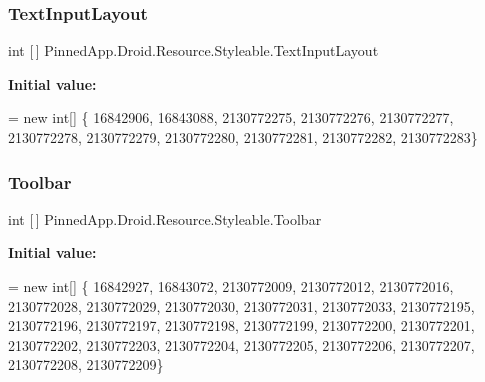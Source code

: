 \subsubsection{\texorpdfstring{Text\+Input\+Layout}{TextInputLayout}}
{\footnotesize\ttfamily int \mbox{[}$\,$\mbox{]} Pinned\+App.\+Droid.\+Resource.\+Styleable.\+Text\+Input\+Layout\hspace{0.3cm}{\ttfamily [static]}}

{\bfseries Initial value\+:}
\begin{DoxyCode}
= \textcolor{keyword}{new} \textcolor{keywordtype}{int}[] \{
                    16842906,
                    16843088,
                    2130772275,
                    2130772276,
                    2130772277,
                    2130772278,
                    2130772279,
                    2130772280,
                    2130772281,
                    2130772282,
                    2130772283\}
\end{DoxyCode}
\mbox{\label{class_pinned_app_1_1_droid_1_1_resource_1_1_styleable_a1dc717da7c76e1721cd5ed14d380794a}} 
\subsubsection{\texorpdfstring{Toolbar}{Toolbar}}
{\footnotesize\ttfamily int \mbox{[}$\,$\mbox{]} Pinned\+App.\+Droid.\+Resource.\+Styleable.\+Toolbar\hspace{0.3cm}{\ttfamily [static]}}

{\bfseries Initial value\+:}
\begin{DoxyCode}
= \textcolor{keyword}{new} \textcolor{keywordtype}{int}[] \{
                    16842927,
                    16843072,
                    2130772009,
                    2130772012,
                    2130772016,
                    2130772028,
                    2130772029,
                    2130772030,
                    2130772031,
                    2130772033,
                    2130772195,
                    2130772196,
                    2130772197,
                    2130772198,
                    2130772199,
                    2130772200,
                    2130772201,
                    2130772202,
                    2130772203,
                    2130772204,
                    2130772205,
                    2130772206,
                    2130772207,
                    2130772208,
                    2130772209\}
\end{DoxyCode}
\mbox{\label{class_pinned_app_1_1_droid_1_1_resource_1_1_styleable_a22af21c6d13f96bb94e3363a901923ec}} 
